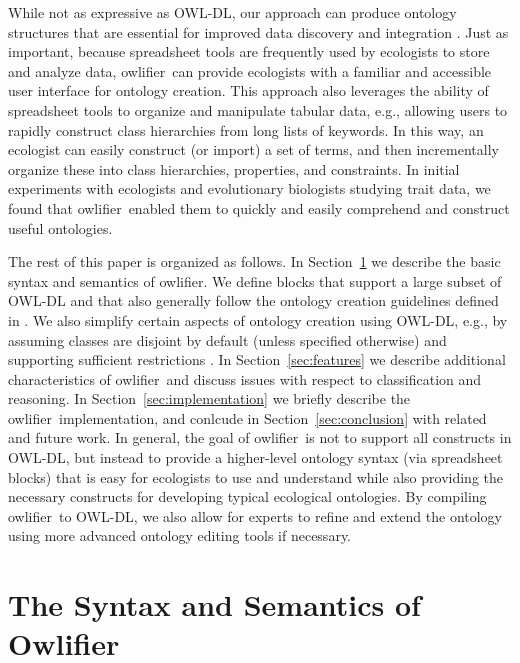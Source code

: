 \documentclass[preprint,number]{elsarticle}
\newcommand{\Owlifier}{\textsf{Owlifier}}
\newcommand{\owlifier}{\textsf{owlifier}}
\newcommand{\secref}[1]{Section~\ref{#1}}
\begin{document}
While not as expressive as OWL-DL, our approach can produce ontology
structures that are essential for improved data discovery and
integration \cite{madin07:_ontol_for_descr_and_synth}. Just as
important, because spreadsheet tools are frequently used by ecologists
to store and analyze data, \owlifier\ can provide ecologists with a
familiar and accessible user interface for ontology creation. This
approach also leverages the ability of spreadsheet tools to organize
and manipulate tabular data, e.g., allowing users to rapidly construct
class hierarchies from long lists of keywords.  In this way, an
ecologist can easily construct (or import) a set of terms, and then
incrementally organize these into class hierarchies, properties, and
constraints. In initial experiments with ecologists and evolutionary
biologists studying trait data, we found that \owlifier\ enabled them
to quickly and easily comprehend and construct useful ontologies.

The rest of this paper is organized as follows. In
\secref{sec:owlifier} we describe the basic syntax and semantics of
\owlifier. We define blocks that support a large subset of OWL-DL and
that also generally follow the ontology creation guidelines defined in
\cite{rector04:_owl_pizzas}. We also simplify certain aspects of
ontology creation using OWL-DL, e.g., by assuming classes are disjoint
by default (unless specified otherwise) and supporting sufficient
restrictions \cite{rector04:_owl_pizzas}. In
\secref{sec:features} we describe additional characteristics of
\owlifier\ and discuss issues with respect to classification and
reasoning. In \secref{sec:implementation} we briefly describe the
\owlifier\ implementation, and conlcude in \secref{sec:conclusion}
with related and future work. In general, the goal of \owlifier\ is
not to support all constructs in OWL-DL, but instead to provide a
higher-level ontology syntax (via spreadsheet blocks) that is easy for
ecologists to use and understand while also providing the necessary
constructs for developing typical ecological ontologies. By compiling
\owlifier\ to OWL-DL, we also allow for experts to refine and extend
the ontology using more advanced ontology editing tools if necessary.



\section{The Syntax and Semantics of \Owlifier}
\label{sec:owlifier}
\end{document}
